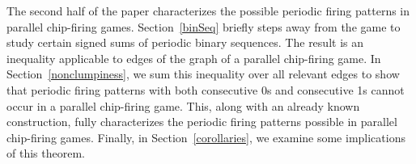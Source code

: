 The second half of the paper characterizes the possible periodic firing
patterns in parallel chip-firing games. Section~\ref{binSeq} briefly steps away
from the game to study certain signed sums of periodic binary sequences. The
result is an inequality applicable to edges of the graph of a parallel
chip-firing game. In Section~\ref{nonclumpiness}, we sum this inequality over
all relevant edges to show that periodic firing patterns with both consecutive
0s and consecutive 1s cannot occur in a parallel chip-firing game. This, along
with an already known construction, fully characterizes the periodic firing
patterns possible in parallel chip-firing games. Finally, in
Section~\ref{corollaries}, we examine some implications of this theorem.
